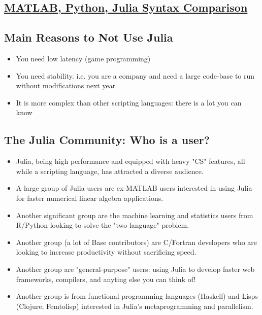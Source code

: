 \documentclass[11pt]{article}
\providecommand{\tightlist}{%
      \setlength{\itemsep}{0pt}\setlength{\parskip}{0pt}}
\begin{document}
    \subsection{\texorpdfstring{\href{http://cheatsheets.quantecon.org/}{MATLAB,
Python, Julia Syntax
Comparison}}{MATLAB, Python, Julia Syntax Comparison}}\label{matlab-python-julia-syntax-comparison}

    \subsection{Main Reasons to Not Use
Julia}\label{main-reasons-to-not-use-julia}

\begin{itemize}
\tightlist
\item
  You need low latency (game programming)
\item
  You need stability. i.e. you are a company and need a large code-base
  to run without modifications next year
\item
  It is more complex than other scripting languages: there is a lot you
  can know
\end{itemize}

    \subsection{The Julia Community: Who is a
user?}\label{the-julia-community-who-is-a-user}

\begin{itemize}
\tightlist
\item
  Julia, being high performance and equipped with heavy "CS" features,
  all while a scripting language, has attracted a diverse audience.
\item
  A large group of Julia users are ex-MATLAB users interested in using
  Julia for faster numerical linear algebra applications.
\item
  Another significant group are the machine learning and statistics
  users from R/Python looking to solve the "two-language" problem.
\item
  Another group (a lot of Base contributors) are C/Fortran developers
  who are looking to increase productivity without sacrificing speed.
\item
  Another group are "general-purpose" users: using Julia to develop
  faster web frameworks, compilers, and anyting else you can think of!
\item
  Another group is from functional programming languages (Haskell) and
  Lisps (Clojure, Femtolisp) interested in Julia's metaprogramming and
  parallelism.
\end{itemize}
\end{document}
